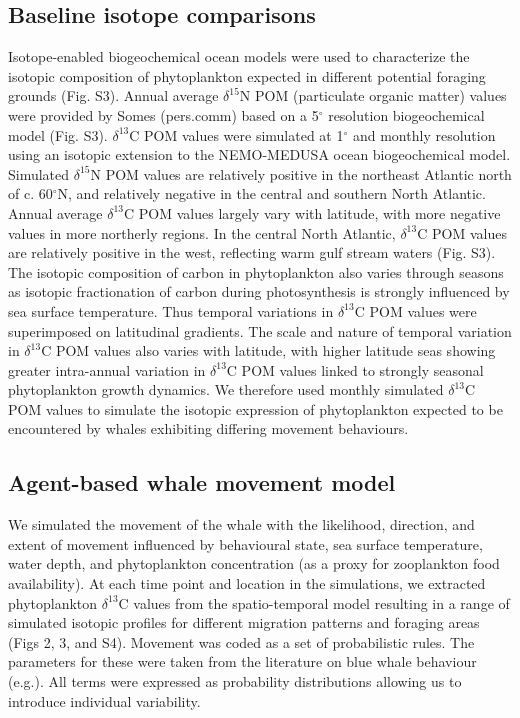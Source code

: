 \documentclass[a4paper,12pt]{article}
\begin{document}
\subsection{Baseline isotope comparisons}
Isotope-enabled biogeochemical ocean models\cite{magozzi2017using,schmittner2016complementary} were used to characterize the isotopic composition of phytoplankton expected in different potential foraging grounds (Fig. S3). 
Annual average $\delta^{15}$N POM (particulate organic matter) values were provided by Somes (pers.comm) based on a 5$^{\circ}$ resolution biogeochemical model (Fig. S3). 
$\delta^{13}$C POM values were simulated at 1$^{\circ}$ and monthly resolution using an isotopic extension to the NEMO-MEDUSA ocean biogeochemical model\cite{magozzi2017using,yool2013medusa}. 
Simulated  $\delta^{15}$N POM values are relatively positive in the northeast Atlantic north of c. 60$^{\circ}$N, and relatively negative in the central and southern North Atlantic. 
Annual average $\delta^{13}$C POM values largely vary with latitude, with more negative values in more northerly regions. 
In the central North Atlantic, $\delta^{13}$C POM values are relatively positive in the west, reflecting warm gulf stream waters (Fig. S3). 
The isotopic composition of carbon in phytoplankton also varies through seasons as isotopic fractionation of carbon during photosynthesis is strongly influenced by sea surface temperature\cite{magozzi2017using,laws1995dependence}.
Thus temporal variations in $\delta^{13}$C POM values were superimposed on latitudinal gradients. 
The scale and nature of temporal variation in $\delta^{13}$C POM values also varies with latitude, with higher latitude seas showing greater intra-annual variation in $\delta^{13}$C POM values linked to strongly seasonal phytoplankton growth dynamics. 
We therefore used monthly simulated $\delta^{13}$C POM values to simulate the isotopic expression of phytoplankton expected to be encountered by whales exhibiting differing movement behaviours.
 
\subsection{Agent-based whale movement model}
We simulated the movement of the whale with the likelihood, direction, and extent of movement influenced by behavioural state, sea surface temperature, water depth, and phytoplankton concentration (as a proxy for zooplankton food availability). 
At each time point and location in the simulations, we extracted phytoplankton $\delta^{13}$C values from the spatio-temporal model\cite{magozzi2017using} resulting in a range of simulated isotopic profiles for different migration patterns and foraging areas (Figs 2, 3, and S4). 
Movement was coded as a set of probabilistic rules. 
The parameters for these were taken from the literature on blue whale behaviour (e.g.\cite{handbook}). 
All terms were expressed as probability distributions allowing us to introduce individual variability. 
 
\end{document}

